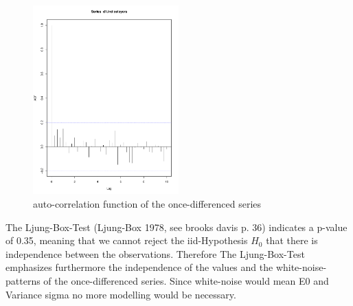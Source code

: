 \documentclass[11pt,a4paper]{article}
\begin{document}
\begin{figure}
\centering
\includegraphics[angle=0,
width=0.5\textwidth]{diff1_acf}
\caption{auto-correlation function of the once-differenced series
\label{fig:diff1_acf}}
\end{figure}
The Ljung-Box-Test (Ljung-Box 1978, see brooks davis p. 36) indicates a p-value of 0.35, meaning that we cannot reject the iid-Hypothesis $H_0$ that there is independence between the observations. Therefore The Ljung-Box-Test emphasizes furthermore the independence of the values and the white-noise-patterns of the once-differenced series. Since white-noise would mean E0 and Variance sigma no more modelling would be necessary. 
\end{document}
